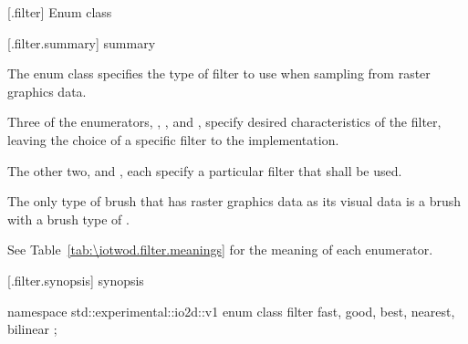  [\iotwod.filter] {Enum class }

 [\iotwod.filter.summary] { summary}

\pnum
The  enum class specifies the type of filter to use when sampling from raster graphics data.

\pnum
Three of the  enumerators, , , and , specify desired characteristics of the filter, leaving the choice of a specific filter to the implementation. 

The other two,  and , each specify a particular filter that shall be used.

\pnum
\begin{note}
The only type of brush that has raster graphics data as its visual data is a brush with a brush type of .
\end{note}

\pnum
See Table~\ref{tab:\iotwod.filter.meanings} for the meaning of each
 enumerator.

 [\iotwod.filter.synopsis] { synopsis}

\begin{codeblock}
namespace std::experimental::io2d::v1 {
  enum class filter {
    fast,
    good,
    best,
    nearest,
    bilinear
  };
}
\end{codeblock}

